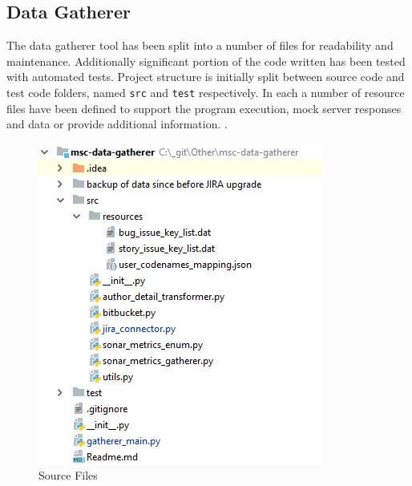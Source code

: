 \subsection{Data Gatherer}\label{sec:impl-data-gatherer}
The data gatherer tool has been split into a number of files for readability and maintenance. Additionally significant portion of the code written has been tested with automated tests. Project structure is initially split between source code and test code folders, named \texttt{src} and \texttt{test} respectively. In each a number of resource files have been defined to support the program execution, mock server responses and data or provide additional information. .


\begin{figure}[!h]
    \centering
    \includegraphics{Figures/impl_src_folder_files.png}
    \caption{Source Files}
    \label{fig:impl-data-gatherer-source-files}
\end{figure}

